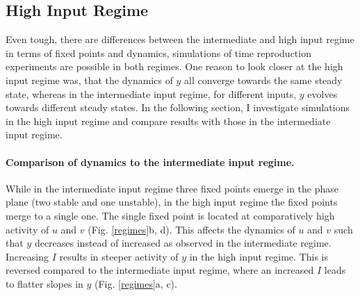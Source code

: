 \documentclass[10pt, a4paper]{article}
\begin{document}
\subsection{High Input Regime}
Even tough, there are differences between the intermediate and high input regime in terms of fixed points and dynamics, simulations of time reproduction experiments are possible in both regimes. 
One reason to look closer at the high input regime was, that the dynamics of $y$ all converge towards the same steady state, whereas in the intermediate input regime, for different inputs, $y$ evolves towards different steady states. 
In the following section, I investigate simulations in the high input regime and compare results with those in the intermediate input regime.

\paragraph{Comparison of dynamics to the intermediate input regime.}
While in the intermediate input regime three fixed points emerge in the phase plane (two stable and one unstable), in the high input regime the fixed points merge to a single one. 
The single fixed point is located at comparatively high activity of $u$ and $v$ 
(Fig. \ref{regimes}b, d).
This affects the dynamics of $u$ and $v$ such that $y$ decreases instead of increased as observed in the intermediate regime. 
Increasing $I$ results in steeper activity of $y$ in the high input regime. This is reversed compared to the intermediate input regime, where an increased $I$ leads to flatter slopes in $y$ (Fig. \ref{regimes}a, c). 
\end{document}
